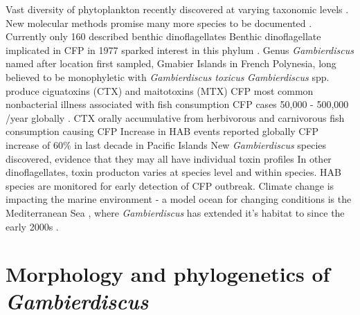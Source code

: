Vast diversity of phytoplankton recently discovered at varying taxonomic levels \cite{simon2009diversity}. 
New molecular methods promise many more species to be documented \cite{murray2012genetic,murray2012transcriptomics}.
Currently only 160 described benthic dinoflagellates \cite{taylor2008dinoflagellate} %
Benthic dinoflagellate implicated in CFP in 1977 sparked interest in this phylum \cite{yasumoto1977finding}.
Genus \emph{Gambierdiscus} named after location first sampled, Gmabier Islands in French Polynesia, long believed to be monophyletic with \emph{Gambierdiscus toxicus} \cite{adachi1979thecal} %
\emph{Gambierdiscus} spp. produce ciguatoxins (CTX) and maitotoxins (MTX) \cite{chinain1997intraspecific,chinain1999morphology,chinain1999seasonal,chinain2010growth,holmes1998gambierdiscus,rhodes2010toxic,fraga2011gambierdiscus,holland2013differences}
CFP most common nonbacterial illness associated with fish consumption \cite{friedman2008ciguatera} %
CFP cases 50,000 - 500,000 /year globally \cite{fleming1998seafood}.
CTX orally accumulative from herbivorous and carnivorous fish consumption causing CFP \cite{bagnis1979clinical,gillespie1987possible,sims1987theoretical} %
Increase in HAB events reported globally \cite{hallegraeff2010ocean} %
CFP increase of 60\% in last decade in Pacific Islands \cite{skinner2011ciguatera}
New \emph{Gambierdiscus} species discovered, evidence that they may all have individual toxin profiles \cite{chinain2010growth,fraga2011gambierdiscus,holland2013differences}
In other dinoflagellates, toxin producton varies at species level and within species.
HAB species are monitored for early detection of CFP outbreak.
Climate change is impacting the marine environment - a model ocean for changing conditions is the Mediterranean Sea \cite{lejeusne2010climate}, where \emph{Gambierdiscus} has extended it's habitat to since the early 2000s \cite{aligizaki2008morphological}.

\section{Morphology and phylogenetics of \emph{Gambierdiscus}}



